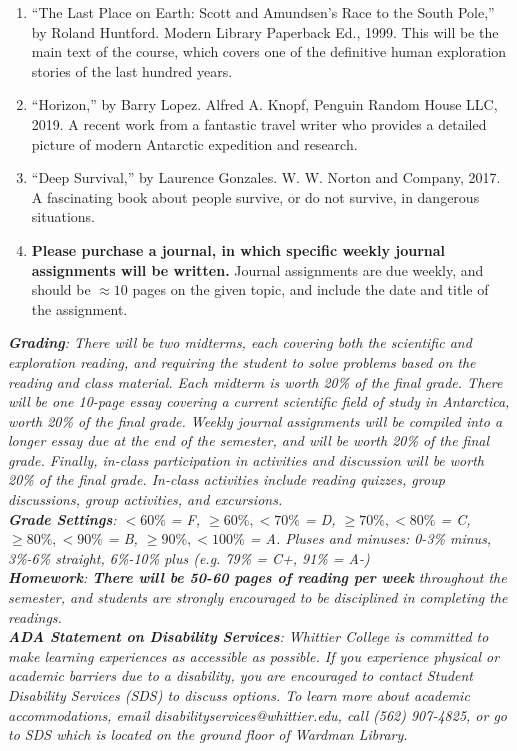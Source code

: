 \documentclass[10pt]{article}
\begin{document}
\begin{enumerate}
\item ``The Last Place on Earth: Scott and Amundsen's Race to the South Pole,'' by Roland Huntford.  Modern Library Paperback Ed., 1999.  This will be the main text of the course, which covers one of the definitive human exploration stories of the last hundred years.
\item ``Horizon,'' by Barry Lopez.  Alfred A. Knopf, Penguin Random House LLC, 2019.  A recent work from a fantastic travel writer who provides a detailed picture of modern Antarctic expedition and research.
\item ``Deep Survival,'' by Laurence Gonzales.  W. W. Norton and Company, 2017.  A fascinating book about people survive, or do not survive, in dangerous situations.
\item \textbf{Please purchase a journal, in which specific weekly journal assignments will be written.}  Journal assignments are due weekly, and should be $\approx 10$ pages on the given topic, and include the date and title of the assignment.
\end{enumerate}
\textit{\textbf{Grading}: There will be two midterms, each covering both the scientific and exploration reading, and requiring the student to solve problems based on the reading and class material. Each midterm is worth 20\% of the final grade. There will be one 10-page essay covering a current scientific field of study in Antarctica, worth 20\% of the final grade. Weekly journal assignments will be compiled into a longer essay due at the end of the semester, and will be worth 20\% of the final grade.  Finally, in-class participation in activities and discussion will be worth 20\% of the final grade.  In-class activities include reading quizzes, group discussions, group activities, and excursions.} \\
\textit{\textbf{Grade Settings}: $<60\%$ = F, $\geq 60\%, <70\%$ = D, $\geq 70\%, <80\%$ = C, $\geq 80\%, <90\%$ = B, $\geq 90\%, <100\%$ = A.  Pluses and minuses: 0-3\% minus, 3\%-6\% straight, 6\%-10\% plus (e.g. 79\% = C+, 91\% = A-)} \\
\textit{\textbf{Homework}: \textbf{There will be 50-60 pages of reading per week} throughout the semester, and students are strongly encouraged to be disciplined in completing the readings.} \\
\textit{\textbf{ADA Statement on Disability Services}: Whittier College is committed to make learning experiences as accessible as possible. If you experience physical or academic barriers due to a disability, you are encouraged to contact Student Disability Services (SDS) to discuss options. To learn more about academic accommodations, email disabilityservices@whittier.edu, call (562) 907-4825, or go to SDS which is located on the ground floor of Wardman Library.} \\
\end{document}
